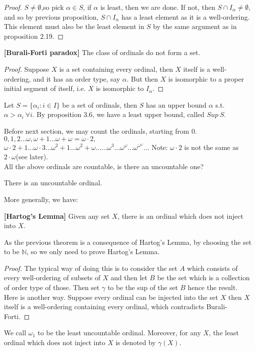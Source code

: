 \begin{proof} $S \neq \emptyset$,so pick $\alpha \in S$, if $\alpha$ is least,
then we are done. If not, then $S \cap I_\alpha \neq \emptyset$, and so by
previous proposition, $S \cap I_\alpha$ has a least element
as it is a well-ordering. This element must also be the least element
in $S$ by the same argument as in proposition 2.19.
\end{proof}
\begin{theorem}{\bf [Burali-Forti paradox]}\label{B;Burali} The class
of ordinals do not form a set.
\end{theorem}
\begin{proof} Suppose $X$ is a set containing every ordinal, then $X$
itself is a well-ordering, and it has an order type, say $\alpha$.
But then $X$ is isomorphic to a proper initial segment of itself,
i.e. $X$ is isomorphic to $I_\alpha$.
\end{proof}
\begin{definition} Let $S=\{ \alpha_i : i \in I\}$ be a set of ordinals,
then $S$ has an upper bound $\alpha$ s.t. $\alpha > \alpha_i ~\forall i$.
By proposition 3.6, we have a least upper bound, called $Sup~S$.
\end{definition}
Before next section, we may count the ordinals, starting from 0.
$0,1,2 \ldots \omega, \omega +1 \ldots \omega +\omega=\omega \cdot 2, $\\
$\omega \cdot 2 +1 \ldots \omega \cdot 3 \ldots \omega^2 +1 \ldots \omega^2 +\omega \ldots \ldots \omega^3 \ldots \omega^\omega \ldots \omega^{\omega^\omega} \ldots$
Note: $\omega \cdot 2$ is not the same as $2 \cdot \omega$(see later).\\
All the above ordinals are countable, is there an uncountable one?
\begin{theorem} There is an uncountable ordinal.
\end{theorem}
More generally, we have:\\
\begin{theorem}{\bf [Hartog's Lemma]}\label{H;Hartog} Given any set $X$,
there is an ordinal which does not inject into $X$.
\end{theorem}
As the previous theorem is a consequence of Hartog's Lemma, by choosing
the set to be $\mathbb{N}$, so we only need to prove Hartog's Lemma.
\begin{proof} The typical way of doing this is to consider the set $A$
which consists of every well-ordering of subsets of $X$ and then let $B$
be the set which is a collection of order type of those. Then set $\gamma$
to be the sup of the set $B$ hence the result. Here is another way.
Suppose every ordinal can be injected into the set $X$ then $X$ itself
is a well-ordering containing every ordinal, which contradicts Burali-Forti.
\end{proof}
\begin{remark} We call $\omega_1$ to be the least uncountable ordinal.
Moreover, for any $X$, the least ordinal which does not inject into $X$
is denoted by $\gamma (X)$.
\end{remark}

